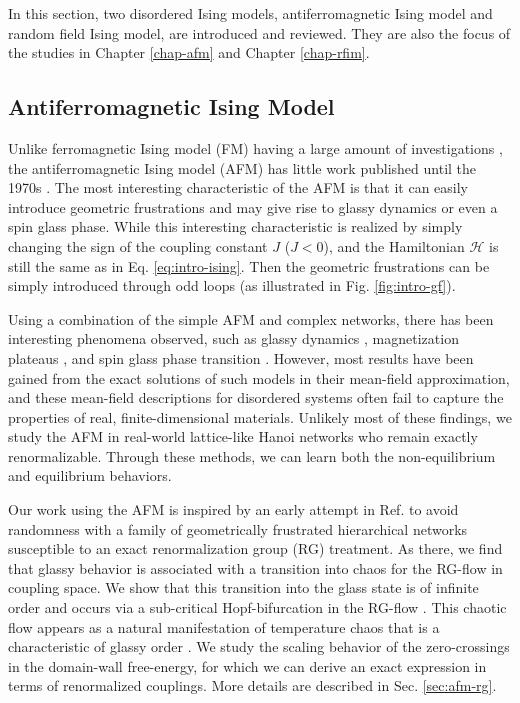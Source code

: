 In this section, two disordered Ising models, antiferromagnetic Ising model and random field Ising model,  are introduced and reviewed. They are also the focus of the studies in Chapter \ref{chap-afm} and Chapter \ref{chap-rfim}.


\subsection{Antiferromagnetic Ising Model}
\label{sec:intro-afm}

Unlike ferromagnetic Ising model (FM) having a large amount of investigations \cite{niss2005history, mccoy2014two}, the antiferromagnetic Ising model (AFM) has little work published until the 1970s \cite{penney2003new}. The most interesting characteristic of the AFM is that it can easily introduce geometric frustrations and may give rise to glassy dynamics or even a spin glass phase. While this interesting characteristic is realized by simply changing the sign of the coupling constant $J$ ($J<0$), and the Hamiltonian $\mathcal{H}$ is still the same as in Eq. \ref{eq:intro-ising}. Then the geometric frustrations can be simply introduced through odd loops (as illustrated in Fig. \ref{fig:intro-gf}).

Using a combination of the simple AFM and complex networks, there has been interesting phenomena observed, such as glassy dynamics \cite{shokef2011}, magnetization plateaus \cite{ohanyan2003mag}, and spin glass phase transition \cite{herrero2008afm}. However, most results have been gained from the exact solutions of such models in their mean-field
approximation, and these mean-field descriptions for disordered systems often fail to capture the properties of real, finite-dimensional materials.  Unlikely most of these findings, we study the AFM in real-world lattice-like Hanoi networks who remain exactly renormalizable. Through these methods, we can learn both the non-equilibrium and equilibrium behaviors. 

Our work using the AFM is inspired by an early attempt in Ref. \cite{mckay1982spin} to avoid randomness with a family of geometrically frustrated hierarchical networks susceptible to an exact renormalization group (RG) treatment. As there, we find that glassy behavior is associated
with a transition into chaos for the RG-flow in coupling space. We
show that this transition into the glass state is of infinite order
and occurs via a sub-critical Hopf-bifurcation in the RG-flow \cite{weinrib1983critical}.
This chaotic flow appears as a natural manifestation of temperature
chaos that is a characteristic of glassy order  \cite{bray1987chaotic, thomas2011zero}.
We study the scaling behavior of the zero-crossings in the domain-wall
free-energy, for which we can derive an exact expression in terms
of renormalized couplings. More details are described in Sec. \ref{sec:afm-rg}.



